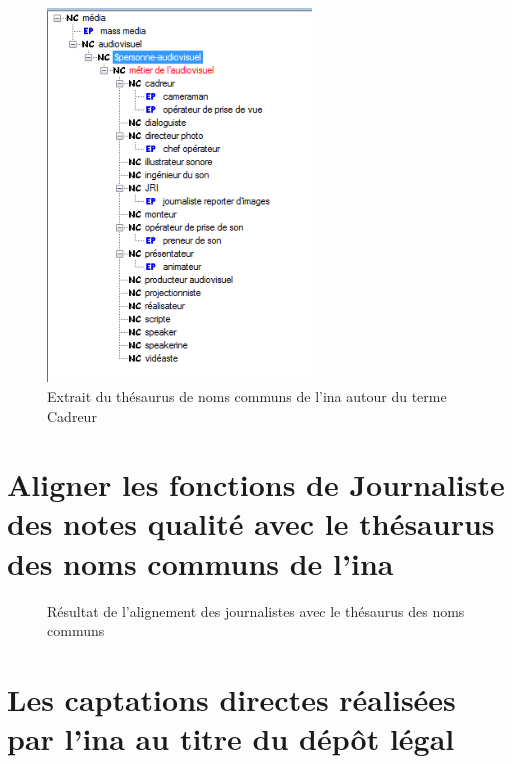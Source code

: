 \begin{figure}[!h]
	\centering
	\includegraphics[width=7cm]{images/cadreur_hierarchie.png}
	\medskip
	\caption[Extrait du thésaurus de noms communs de l'\ac{ina}]{Extrait du thésaurus de noms communs de l'\ac{ina} autour du terme \og Cadreur\fg{}}
\end{figure}

\chapter{\label{annexe_alignement_journaliste}Aligner les fonctions de \og Journaliste\fg{} des notes qualité avec le thésaurus des noms communs de l'\ac{ina}}

\begin{figure}[!h]
	\centering
	\caption{Résultat de l'alignement des journalistes avec le thésaurus des noms communs}
	\label{alignement_journaliste}
\end{figure}

\chapter{\label{annexe_dl_captation}Les captations directes réalisées par l'\ac{ina} au titre du dépôt légal}

